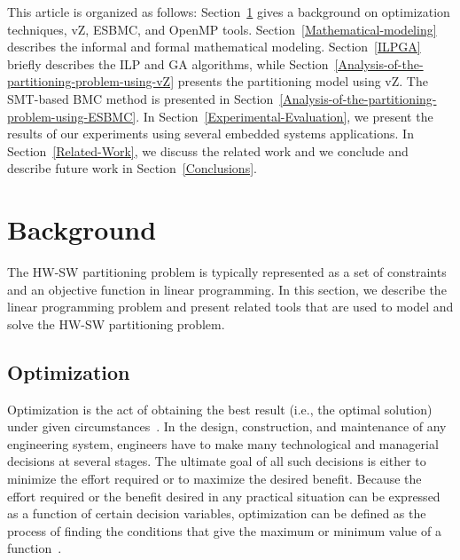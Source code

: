 This article is organized as follows: Section~\ref{background} gives a background on optimization techniques, vZ, ESBMC, and OpenMP tools. 
Section~\ref{Mathematical-modeling} describes the informal and formal mathematical modeling. Section~\ref{ILPGA} briefly describes the ILP and GA algorithms, while Section~\ref{Analysis-of-the-partitioning-problem-using-vZ} presents the partitioning model using vZ. The SMT-based BMC method is presented in Section~\ref{Analysis-of-the-partitioning-problem-using-ESBMC}. In Section~\ref{Experimental-Evaluation}, we present the results of our experiments using several embedded systems applications. In Section~\ref{Related-Work}, we discuss the related work and we conclude and describe future work in Section~\ref{Conclusions}.

\section{Background}
\label{background}

The HW-SW partitioning problem is typically represented as a set of constraints and an objective function in linear programming. In this section, we describe the linear programming problem and present related tools that are used to model and solve the HW-SW partitioning problem.

\subsection{Optimization}
\label{Optimization}

Optimization is the act of obtaining the best result (i.e., the optimal solution) under given circumstances~\cite{Rao2009}. In the design, construction, and maintenance of any engineering system, engineers have to make many technological and managerial decisions at several stages. The ultimate goal of all such decisions is either to minimize the effort required or to maximize the desired benefit. Because the effort required or the benefit desired in any practical situation can be expressed as a function of certain decision variables, optimization can be defined as the process of finding the conditions that give the maximum or minimum value of a function~\cite{Rao2009}.

